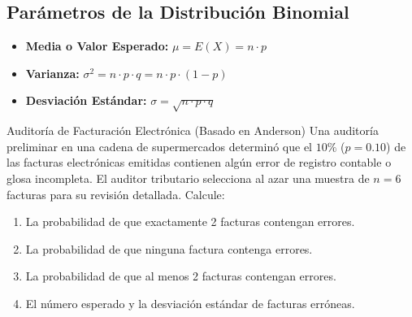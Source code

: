 \subsection{Parámetros de la Distribución Binomial}
\begin{itemize}
    \item \textbf{Media o Valor Esperado:} $\mu = E(X) = n \cdot p$
    \item \textbf{Varianza:} $\sigma^2 = n \cdot p \cdot q = n \cdot p \cdot (1-p)$
    \item \textbf{Desviación Estándar:} $\sigma = \sqrt{n \cdot p \cdot q}$
\end{itemize}

\begin{ejemplo}{Auditoría de Facturación Electrónica (Basado en Anderson)}
Una auditoría preliminar en una cadena de supermercados determinó que el $10\%$ ($p = 0.10$) de las facturas electrónicas emitidas contienen algún error de registro contable o glosa incompleta. El auditor tributario selecciona al azar una muestra de $n = 6$ facturas para su revisión detallada. Calcule:
\begin{enumerate}[label=\alph*)]
    \item La probabilidad de que exactamente 2 facturas contengan errores.
    \item La probabilidad de que ninguna factura contenga errores.
    \item La probabilidad de que al menos 2 facturas contengan errores.
    \item El número esperado y la desviación estándar de facturas erróneas.
\end{enumerate}


\end{ejemplo}
